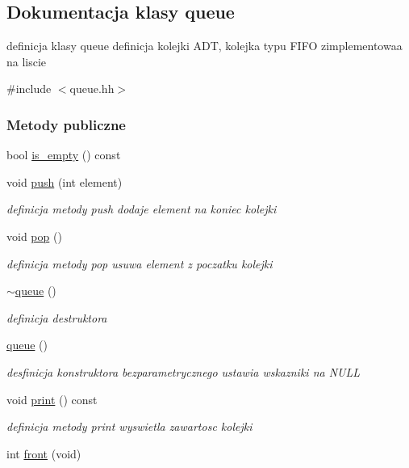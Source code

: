 \hypertarget{classqueue}{}\subsection{Dokumentacja klasy queue}
\label{classqueue}


definicja klasy queue definicja kolejki A\+D\+T, kolejka typu F\+I\+F\+O zimplementowaa na liscie  




{\ttfamily \#include $<$queue.\+hh$>$}

\subsubsection*{Metody publiczne}
\begin{DoxyCompactItemize}
\item 
bool \hyperlink{classqueue_a528253721da400ec103e7a0bf6f326e1}{is\+\_\+empty} () const 
\item 
void \hyperlink{classqueue_a94621434051ab5f39a20e1ab8dd1fcc5}{push} (int element)
\begin{DoxyCompactList}\small\item\em definicja metody push dodaje element na koniec kolejki \end{DoxyCompactList}\item 
void \hyperlink{classqueue_a64eb1ff3abb18bc130ab7390c9743f80}{pop} ()
\begin{DoxyCompactList}\small\item\em definicja metody pop usuwa element z poczatku kolejki \end{DoxyCompactList}\item 
\hyperlink{classqueue_ae627ff3c7e0015717518229b43b023a1}{$\sim$queue} ()
\begin{DoxyCompactList}\small\item\em definicja destruktora \end{DoxyCompactList}\item 
\hyperlink{classqueue_a7d34ca890402e85d02107280b32ae73a}{queue} ()
\begin{DoxyCompactList}\small\item\em desfinicja konstruktora bezparametrycznego ustawia wskazniki na N\+U\+L\+L \end{DoxyCompactList}\item 
void \hyperlink{classqueue_aa0ab9e292d17a60504bfa72e6d48aee2}{print} () const 
\begin{DoxyCompactList}\small\item\em definicja metody print wyswietla zawartosc kolejki \end{DoxyCompactList}\item 
int \hyperlink{classqueue_a1d03a6cbc5ae778827e7376612489625}{front} (void)
\end{DoxyCompactItemize}
